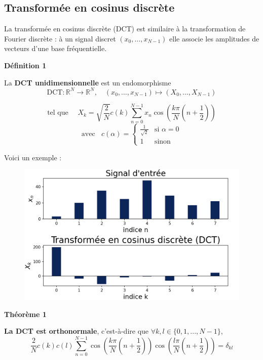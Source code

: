 \documentclass{article}
\newenvironment{mydefinition}[1]{%
  \begin{definitionbox}%
  \noindent\textbf{#1}\par
}{%
  \end{definitionbox}%
}
\begin{document}
\subsection{Transformée en cosinus discrète}

La transformée en cosinus discrète (DCT) est similaire à la transformation de Fourier discrète : à un signal discret $(x_0,  \ldots, x_{N-1})$ elle associe les amplitudes de vecteurs d'une base fréquentielle.

\vspace{.2cm}

\begin{mydefinition}{Définition 1}
    La \textbf{DCT unidimensionnelle} est un endomorphisme \[\text{DCT} : \mathbb{R}^N \rightarrow \mathbb{R}^N, \quad (x_0, \ldots, x_{N-1}) \mapsto (X_0, \ldots, X_{N-1})\]

    \vspace{-0.1cm}
    \begin{equation*}
        \text{tel que } \quad X_k = \sqrt{\dfrac{2}{N}}c(k)\sum_{n=0}^{N-1} x_n \cos \left( \frac{k\pi}{N} \left( n + \frac{1}{2} \right) \right)
    \end{equation*}
    \[
        \text{avec} \ \ \ \ c(\alpha) =
        \begin{cases}
            \frac{1}{\sqrt{2}} & \text{si } \alpha = 0 \\
            1 & \text{sinon}
        \end{cases}
    \]
\end{mydefinition}




Voici un exemple :

\begin{figure}[H]
    \centering
    \includegraphics[width=0.5\linewidth]{uni.png}
\end{figure}

\begin{mydefinition}{Théorème 1}
    \textbf{La DCT est orthonormale}, c'est-à-dire que $\forall k, l \in \{0, 1, ..., N-1\}$,
    $$
    \dfrac{2}{N} c(k)c(l)\sum_{n=0}^{N-1} \cos \left( \frac{k\pi}{N} \left( n + \frac{1}{2} \right) \right)\cos \left( \frac{l\pi}{N} \left( n + \frac{1}{2} \right) \right) = \delta_{kl}
    $$
\end{mydefinition}
\end{document}
